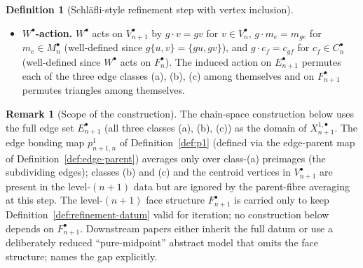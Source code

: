 \documentclass[11pt, a4paper]{amsart}
\theoremstyle{definition}
\newtheorem{definition}[theorem]{Definition}
\newtheorem{remark}[theorem]{Remark}
\begin{document}
\begin{definition}[Schl\"{a}fli-style refinement step with vertex
inclusion]
\begin{itemize}
  sequence $(e_1, \ldots, e_k)$ produces $k$ triangles
  $(m_{e_i}, c_f, m_{e_{i+1}})$ (cyclic indices), each with edge
  sequence
  $(\{m_{e_i}, c_f\}, \{c_f, m_{e_{i+1}}\}, \{m_{e_{i+1}}, m_{e_i}\})$
  drawn from edge classes (b), (b), (c) respectively. All three
  boundary edges lie in $E_{n+1}^\bullet$ by construction, so
  $\partial_{n+1}^\bullet$ is well-defined and the iterated
  refinement datum is well-formed in the sense of
  Definition~\ref{def:refinement-datum} (a graph-plus-faces datum
  in which every face boundary lies in the edge set, but no
  converse incidence is required: an edge need not belong to any
  face boundary). In particular, the class-(a) subdividing edges
  $\{u, m_e\}$, $\{m_e, v\}$ are present in $E_{n+1}^\bullet$ but
  do not appear in any $\partial_{n+1}^\bullet(f)$; this is
  intentional and is the only place the datum departs from a
  classical $2$-dimensional cell complex (in which one would
  retain the $2$-cells of $f$ as $2$-cells of the next level
  rather than subdividing them into triangles).
\item \textbf{$W^\bullet$-action.} $W^\bullet$ acts on
  $V_{n+1}^\bullet$ by $g \cdot v = gv$ for $v \in V_n^\bullet$,
  $g \cdot m_e = m_{ge}$ for $m_e \in M_n^\bullet$ (well-defined
  since $g\{u, v\} = \{gu, gv\}$), and $g \cdot c_f = c_{gf}$
  for $c_f \in C_n^\bullet$ (well-defined since $W^\bullet$ acts
  on $F_n^\bullet$). The induced action on $E_{n+1}^\bullet$
  permutes each of the three edge classes (a), (b), (c) among
  themselves and on $F_{n+1}^\bullet$ permutes triangles among
  themselves.
\end{itemize}
\end{definition}

\begin{remark}[Scope of the construction]
\label{rmk:refinement-scope}
The chain-space construction below uses the full edge set
$E_{n+1}^\bullet$ (all three classes (a), (b), (c)) as the
domain of $X_{n+1}^{1, \bullet}$. The edge bonding map
$p_{n+1, n}^1$ of Definition~\ref{def:p1} (defined via the
edge-parent map of Definition~\ref{def:edge-parent}) averages only
over class-(a) preimages (the subdividing edges); classes (b) and
(c) and the centroid vertices in $V_{n+1}^\bullet$ are present in
the level-$(n+1)$ data but are ignored by the parent-fibre
averaging at this step. The level-$(n+1)$ face structure
$F_{n+1}^\bullet$ is carried only to keep
Definition~\ref{def:refinement-datum} valid for iteration; no
construction below depends on $F_{n+1}^\bullet$. Downstream
papers \cite{CascadeClosureDynamics, CascadeRefinementCompat}
either inherit the full datum or use a deliberately reduced
``pure-midpoint'' abstract model that omits the face structure;
\cite[\S\texttt{sec:scope-and-gap}]{CascadeRefinementCompat} names
the gap explicitly.
\end{remark}
\end{document}
